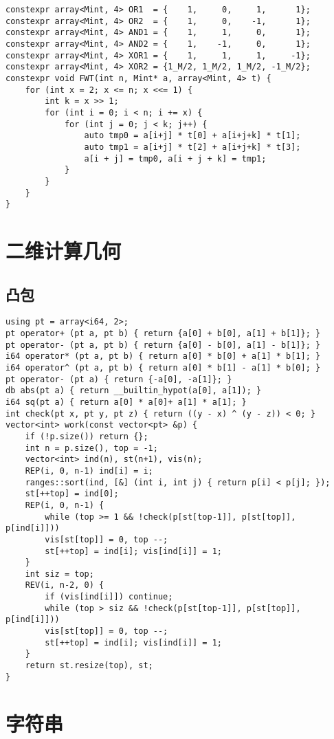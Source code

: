 \documentclass[a4paper,landscape,twocolumn]{ctexart}
\begin{document}
\begin{lstlisting}
constexpr array<Mint, 4> OR1  = {    1,     0,     1,      1};
constexpr array<Mint, 4> OR2  = {    1,     0,    -1,      1};
constexpr array<Mint, 4> AND1 = {    1,     1,     0,      1};
constexpr array<Mint, 4> AND2 = {    1,    -1,     0,      1};
constexpr array<Mint, 4> XOR1 = {    1,     1,     1,     -1};
constexpr array<Mint, 4> XOR2 = {1_M/2, 1_M/2, 1_M/2, -1_M/2};
constexpr void FWT(int n, Mint* a, array<Mint, 4> t) {
	for (int x = 2; x <= n; x <<= 1) {
		int k = x >> 1;
		for (int i = 0; i < n; i += x) {
			for (int j = 0; j < k; j++) {
				auto tmp0 = a[i+j] * t[0] + a[i+j+k] * t[1];
				auto tmp1 = a[i+j] * t[2] + a[i+j+k] * t[3];
				a[i + j] = tmp0, a[i + j + k] = tmp1;
			}
		}
	}
}
\end{lstlisting}

\section{二维计算几何}

\subsection{凸包}

\begin{lstlisting}
using pt = array<i64, 2>;
pt operator+ (pt a, pt b) { return {a[0] + b[0], a[1] + b[1]}; }
pt operator- (pt a, pt b) { return {a[0] - b[0], a[1] - b[1]}; }
i64 operator* (pt a, pt b) { return a[0] * b[0] + a[1] * b[1]; }
i64 operator^ (pt a, pt b) { return a[0] * b[1] - a[1] * b[0]; }
pt operator- (pt a) { return {-a[0], -a[1]}; }
db abs(pt a) { return __builtin_hypot(a[0], a[1]); }
i64 sq(pt a) { return a[0] * a[0]+ a[1] * a[1]; }
int check(pt x, pt y, pt z) { return ((y - x) ^ (y - z)) < 0; }
vector<int> work(const vector<pt> &p) {
	if (!p.size()) return {};
	int n = p.size(), top = -1;
	vector<int> ind(n), st(n+1), vis(n);
	REP(i, 0, n-1) ind[i] = i;
	ranges::sort(ind, [&] (int i, int j) { return p[i] < p[j]; });
	st[++top] = ind[0];
	REP(i, 0, n-1) {
		while (top >= 1 && !check(p[st[top-1]], p[st[top]], p[ind[i]]))
		vis[st[top]] = 0, top --;
		st[++top] = ind[i]; vis[ind[i]] = 1;
	}
	int siz = top;
	REV(i, n-2, 0) {
		if (vis[ind[i]]) continue;
		while (top > siz && !check(p[st[top-1]], p[st[top]], p[ind[i]]))
		vis[st[top]] = 0, top --;
		st[++top] = ind[i]; vis[ind[i]] = 1;
	}
	return st.resize(top), st;
}
\end{lstlisting}

\section{字符串}
\end{document}
